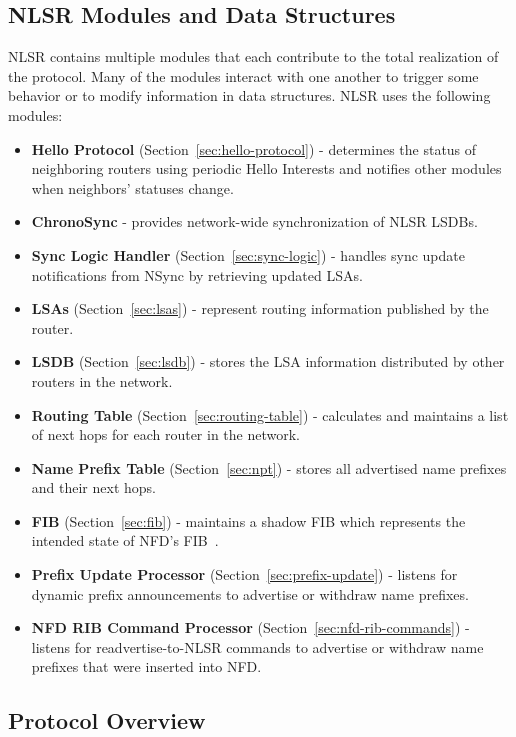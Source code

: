 \subsection{NLSR Modules and Data Structures}
\label{sec:modules}
NLSR contains multiple modules that each contribute to the total realization of the protocol.
Many of the modules interact with one another to trigger some behavior or to modify information in data structures.
NLSR uses the following modules:
\begin{itemize}
\item \textbf{Hello Protocol} (Section~\ref{sec:hello-protocol}) - determines the status of neighboring routers using periodic Hello Interests and notifies other modules when neighbors' statuses change.
\item \textbf{ChronoSync} - provides network-wide synchronization of NLSR LSDBs.~\cite{chronosync}
\item \textbf{Sync Logic Handler} (Section~\ref{sec:sync-logic}) - handles sync update notifications from NSync by retrieving updated LSAs.
\item \textbf{LSAs} (Section~\ref{sec:lsas}) - represent routing information published by the router.
\item \textbf{LSDB} (Section~\ref{sec:lsdb}) - stores the LSA information distributed by other routers in the network.
\item \textbf{Routing Table} (Section~\ref{sec:routing-table}) - calculates and maintains a list of next hops for each router in the network.
\item \textbf{Name Prefix Table} (Section~\ref{sec:npt}) - stores all advertised name prefixes and their next hops.
\item \textbf{FIB} (Section~\ref{sec:fib}) - maintains a shadow FIB which represents the intended state of NFD's FIB~\cite{NFD}.
\item \textbf{Prefix Update Processor} (Section~\ref{sec:prefix-update}) - listens for dynamic prefix announcements to advertise or withdraw name prefixes.
\item \textbf{NFD RIB Command Processor} (Section~\ref{sec:nfd-rib-commands}) - listens for readvertise-to-NLSR commands to advertise or withdraw name prefixes that were inserted into NFD.
\end{itemize}

\subsection{Protocol Overview}
\label{sec:protocol-overview}

